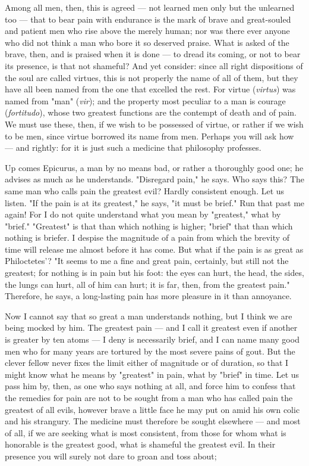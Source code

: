  Among all men, then, this is agreed — not learned men only but the unlearned too — that to bear pain with endurance is the mark of brave and great-souled and patient men who rise above the merely human; nor was there ever anyone who did not think a man who bore it so deserved praise. What is asked of the brave, then, and is praised when it is done — to dread its coming, or not to bear its presence, is that not shameful? And yet consider: since all right dispositions of the soul are called virtues, this is not properly the name of all of them, but they have all been named from the one that excelled the rest. For virtue (\textit{virtus}) was named from "man" (\textit{vir}); and the property most peculiar to a man is courage (\textit{fortitudo}), whose two greatest functions are the contempt of death and of pain. We must use these, then, if we wish to be possessed of virtue, or rather if we wish to be men, since virtue borrowed its name from men. Perhaps you will ask how — and rightly: for it is just such a medicine that philosophy professes.

 Up comes Epicurus, a man by no means bad, or rather a thoroughly good one; he advises as much as he understands. "Disregard pain," he says. Who says this? The same man who calls pain the greatest evil? Hardly consistent enough. Let us listen. "If the pain is at its greatest," he says, "it must be brief." Run that past me again! For I do not quite understand what you mean by "greatest," what by "brief." "Greatest" is that than which nothing is higher; "brief" that than which nothing is briefer. I despise the magnitude of a pain from which the brevity of time will release me almost before it has come. But what if the pain is as great as Philoctetes'? "It seems to me a fine and great pain, certainly, but still not the greatest; for nothing is in pain but his foot: the eyes can hurt, the head, the sides, the lungs can hurt, all of him can hurt; it is far, then, from the greatest pain." Therefore, he says, a long-lasting pain has more pleasure in it than annoyance.

 Now I cannot say that so great a man understands nothing, but I think we are being mocked by him. The greatest pain — and I call it greatest even if another is greater by ten atoms — I deny is necessarily brief, and I can name many good men who for many years are tortured by the most severe pains of gout. But the clever fellow never fixes the limit either of magnitude or of duration, so that I might know what he means by "greatest" in pain, what by "brief" in time. Let us pass him by, then, as one who says nothing at all, and force him to confess that the remedies for pain are not to be sought from a man who has called pain the greatest of all evils, however brave a little face he may put on amid his own colic and his strangury. The medicine must therefore be sought elsewhere — and most of all, if we are seeking what is most consistent, from those for whom what is honorable is the greatest good, what is shameful the greatest evil. In their presence you will surely not dare to groan and toss about;

